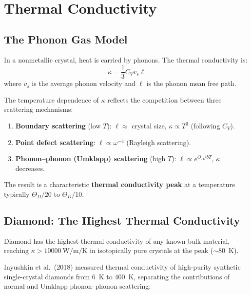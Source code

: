 \section{Thermal Conductivity}

\subsection{The Phonon Gas Model}

In a nonmetallic crystal, heat is carried by phonons. The thermal conductivity is:
\begin{equation}
  \kappa = \frac{1}{3} C_V v_s \ell
\end{equation}
where $v_s$ is the average phonon velocity and $\ell$ is the phonon mean free path.

The temperature dependence of $\kappa$ reflects the competition between three scattering mechanisms:
\begin{enumerate}[nosep]
  \item \textbf{Boundary scattering} (low $T$): $\ell \approx$ crystal size, $\kappa \propto T^3$ (following $C_V$).
  \item \textbf{Point defect scattering}: $\ell \propto \omega^{-4}$ (Rayleigh scattering).
  \item \textbf{Phonon--phonon (Umklapp) scattering} (high $T$): $\ell \propto e^{\Theta_D/bT}$, $\kappa$ decreases.
\end{enumerate}

The result is a characteristic \textbf{thermal conductivity peak} at a temperature typically $\Theta_D/20$ to $\Theta_D/10$.

\subsection{Diamond: The Highest Thermal Conductivity}

Diamond has the highest thermal conductivity of any known bulk material, reaching $\kappa > \SI{10000}{\watt\per\metre\per\kelvin}$ in isotopically pure crystals at the peak ($\sim$\SI{80}{\kelvin}).

Inyushkin et al.\ (2018) measured thermal conductivity of high-purity synthetic single-crystal diamonds from \SI{6}{\kelvin} to \SI{400}{\kelvin}, separating the contributions of normal and Umklapp phonon--phonon scattering:

